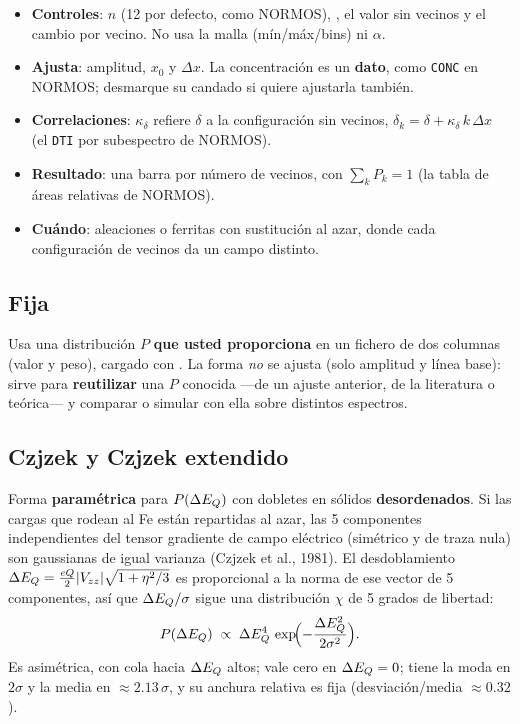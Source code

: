 \begin{itemize}[nosep]
  \item \textbf{Controles}:  $n$ (12 por defecto, como NORMOS),
        , el valor sin vecinos y el cambio por
        vecino. No usa la malla (mín/máx/bins) ni $\alpha$.
  \item \textbf{Ajusta}: amplitud, $x_0$ y $\Delta x$. La concentración es un
        \textbf{dato}, como \texttt{CONC} en NORMOS; desmarque su candado si
        quiere ajustarla también.
  \item \textbf{Correlaciones}: $\kappa_\delta$ refiere $\delta$ a la
        configuración sin vecinos, $\delta_k = \delta + \kappa_\delta\,k\,\Delta x$
        (el \texttt{DTI} por subespectro de NORMOS).
  \item \textbf{Resultado}: una barra por número de vecinos, con $\sum_k P_k = 1$
        (la tabla de áreas relativas de NORMOS).
  \item \textbf{Cuándo}: aleaciones o ferritas con sustitución al azar, donde
        cada configuración de vecinos da un campo distinto.
\end{itemize}

\subsection{Fija}
\label{sec:forma-fija}

Usa una distribución $P$ \textbf{que usted proporciona} en un fichero de dos
columnas (valor y peso), cargado con . La forma \emph{no} se
ajusta (solo amplitud y línea base): sirve para \textbf{reutilizar} una $P$
conocida —de un ajuste anterior, de la literatura o teórica— y comparar o simular
con ella sobre distintos espectros.

\subsection{Czjzek y Czjzek extendido}
\label{sec:forma-czjzek}

Forma \textbf{paramétrica} para $P(\Delta E_{Q})$ con dobletes en sólidos
\textbf{desordenados}. Si las cargas que rodean al Fe están repartidas al azar,
las 5 componentes independientes del tensor gradiente de campo eléctrico
(simétrico y de traza nula) son gaussianas de igual varianza (Czjzek et al.,
1981). El desdoblamiento $\Delta E_{Q}=\tfrac{eQ}{2}|V_{zz}|\sqrt{1+\eta^2/3}$ es
proporcional a la norma de ese vector de 5 componentes, así que $\Delta E_{Q}/\sigma$
sigue una distribución $\chi$ de 5 grados de libertad:
\[
  P(\Delta E_{Q}) \;\propto\; \Delta E_{Q}^{4}\,\exp\!\Bigl(-\frac{\Delta E_{Q}^{2}}{2\sigma^{2}}\Bigr).
\]
Es asimétrica, con cola hacia $\Delta E_{Q}$ altos; vale cero en $\Delta E_{Q}=0$; tiene la moda
en $2\sigma$ y la media en $\approx 2.13\,\sigma$, y su anchura relativa es fija
(desviación/media $\approx 0.32$).


